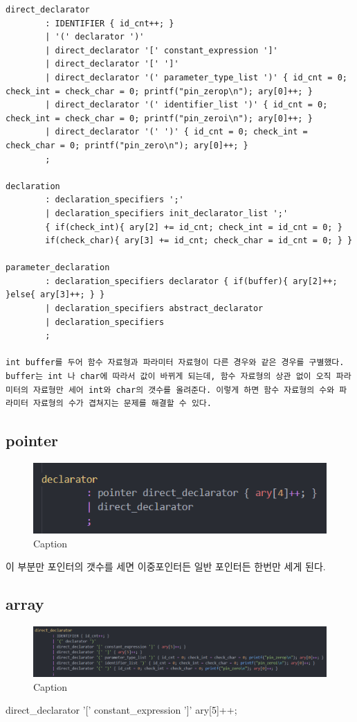 \documentclass{article}
\begin{document}
\begin{verbatim}
direct_declarator
        : IDENTIFIER { id_cnt++; }
        | '(' declarator ')'
        | direct_declarator '[' constant_expression ']'
        | direct_declarator '[' ']'
        | direct_declarator '(' parameter_type_list ')' { id_cnt = 0; check_int = check_char = 0; printf("pin_zerop\n"); ary[0]++; }
        | direct_declarator '(' identifier_list ')' { id_cnt = 0; check_int = check_char = 0; printf("pin_zeroi\n"); ary[0]++; }
        | direct_declarator '(' ')' { id_cnt = 0; check_int = check_char = 0; printf("pin_zero\n"); ary[0]++; }
        ;

declaration
        : declaration_specifiers ';'
        | declaration_specifiers init_declarator_list ';' 
        { if(check_int){ ary[2] += id_cnt; check_int = id_cnt = 0; }
        if(check_char){ ary[3] += id_cnt; check_char = id_cnt = 0; } }

parameter_declaration
        : declaration_specifiers declarator { if(buffer){ ary[2]++; }else{ ary[3]++; } }
        | declaration_specifiers abstract_declarator
        | declaration_specifiers
        ;

int buffer를 두어 함수 자료형과 파라미터 자료형이 다른 경우와 같은 경우를 구별했다. buffer는 int 나 char에 따라서 값이 바뀌게 되는데, 함수 자료형의 상관 없이 오직 파라미터의 자료형만 세어 int와 char의 갯수를 올려준다. 이렇게 하면 함수 자료형의 수와 파라미터 자료형의 수가 겹쳐지는 문제를 해결할 수 있다.

\end{verbatim}

\newpage

\subsection{pointer}
\begin{figure}[h]
    \centering
    \includegraphics[scale = 0.8]{pointer.png}
    \caption{Caption}
\end{figure}
이 부분만 포인터의 갯수를 세면 이중포인터든 일반 포인터든 한번만 세게 된다.

\subsection{array}
\begin{figure}[h]
    \centering
    \includegraphics[scale = 0.8]{function2.png}
    \caption{Caption}
\end{figure}
direct\_declarator '[' constant\_expression ']' { ary[5]++; }
\end{document}
